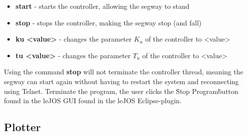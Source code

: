 \begin{itemize}
\item \textbf{start} - starts the controller, allowing the segway to stand
\item \textbf{stop} - stops the controller, making the segway stop (and fall)
\item \textbf{ku <value>} - changes the parameter $K_{u}$ of the controller to <value>
\item \textbf{tu <value>} - changes the parameter $T_{u}$ of the controller to <value>
\end{itemize}

\noindent Using the command \textbf{stop} will not terminate the controller thread, meaning the segway can start again without having to restart the system and reconnecting using Telnet. Terminate the program, the user clicks the \"Stop Program\" button found in the leJOS GUI found in the leJOS Eclipse-plugin.

\subsection{Plotter}


